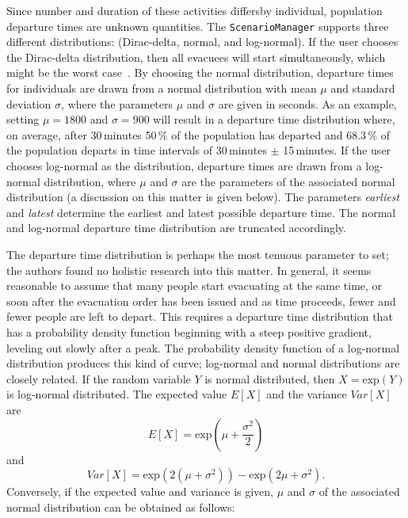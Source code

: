 \begin{itemize}
Since number and duration of these activities differsby individual, population departure times are unknown quantities. The \lstinline|ScenarioManager| supports three different distributions: (Dirac-delta, normal, and log-normal). If the user chooses the Dirac-delta distribution, then all evacuees will start simultaneously, which might be the worst case~\citep{00LaemmelKluepfel2012InfluenceOfDepartureTimeDistribution}. By choosing the normal distribution, departure times for individuals are drawn from a normal distribution with mean $\mu$ and standard deviation $\sigma$, where the parameters $\mu$ and $\sigma$ are given in seconds. As an example, setting $\mu = 1800$ and $\sigma =  900$ will result in a departure time distribution where, on average, after 30\,minutes 50\,\% of the population has departed and 68.3\,\% of the population departs in time intervals of 30\,minutes $\pm$ 15\,minutes. If the user chooses log-normal as the distribution, departure times are drawn from a log-normal distribution, where $\mu$ and $\sigma$ are the parameters of the associated normal distribution (a discussion on this matter is given below). The parameters \emph{earliest} and \emph{latest} determine the earliest and latest possible departure time. The normal and log-normal departure time distribution are truncated accordingly.
\end{itemize}
%
The departure time distribution is perhaps the most tenuous parameter to set; the authors found no holistic research into this matter. 
In general, it seems reasonable to assume that many people start evacuating at the same time, or soon after the evacuation order has been issued and as time proceeds, fewer and fewer people are left to depart. 
This requires a departure time distribution that has a probability density function beginning with a steep positive gradient, leveling out slowly after a peak. The probability density function of a log-normal distribution produces this kind of curve; log-normal and normal distributions are closely related. If the random variable $Y$ is normal distributed, then $X = \text{exp}(Y)$ is log-normal distributed. The expected value $E[X]$ and the variance $Var[X]$ are
\begin{equation}
E[X] = \text{exp}(\mu + \frac{\sigma^2}{2})
\end{equation}
and 
\begin{equation}
Var[X]=\text{exp}(2(\mu+\sigma^2))-\text{exp}(2\mu+\sigma^2).
\end{equation}
Conversely, if the expected value and variance is given, $\mu$ and $\sigma$ of the associated normal distribution can be obtained as follows:
